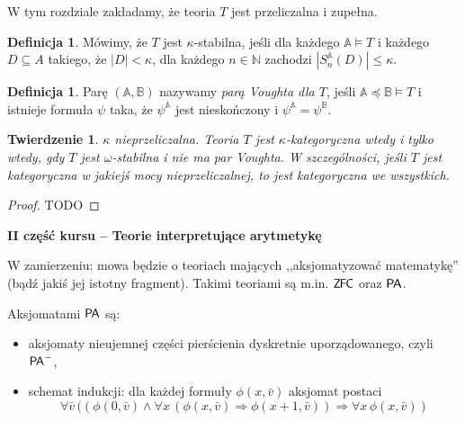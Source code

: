 \documentclass{article}
\newcommand{\N}{\mathbb{N}}
\newcommand{\A}{\mathbb{A}}
\newcommand{\B}{\mathbb{B}}
\theoremstyle{plain}
\newtheorem{tw}[thm]{Twierdzenie}
\theoremstyle{definition}
\newtheorem{df}[thm]{Definicja}
\theoremstyle{remark}
\newcommand{\PA}{\mathsf{P \mkern-1.9mu A}}
\newcommand{\ZFC}{\mathsf{Z \mkern-1.6mu F \mkern-1.5mu C}}
\begin{document}
W tym rozdziale zakładamy, że teoria $T$ jest przeliczalna i zupełna.

\begin{df}
	Mówimy, że $T$ jest $\kappa$-stabilna, jeśli dla każdego $\A \models T$ i każdego $D \subseteq A$ takiego, że $|D| < \kappa$, dla każdego $n \in \N$ zachodzi $|S_n^{\A}(D)| \leq \kappa$.
\end{df}

\begin{df}
	Parę $(\A, \B)$ nazywamy \textit{parą Voughta dla $T$}, jeśli $\A \preccurlyeq \B \models T$ i istnieje formuła $\psi$ taka, że $\psi^{\A}$ jest nieskończony i $\psi^{\A} = \psi^{\B}$.
\end{df}

\begin{tw}
	 $\kappa$ nieprzeliczalna. Teoria $T$ jest $\kappa$-kategoryczna wtedy i tylko wtedy, gdy $T$ jest $\omega$-stabilna i nie ma par Voughta.
	 W szczególności, jeśli $T$ jest kategoryczna w jakiejś mocy nieprzeliczalnej, to jest kategoryczna we wszystkich.
\end{tw}
\begin{proof}
	 TODO
\end{proof}

{\Large \textbf{II część kursu -- Teorie interpretujące arytmetykę}}

W zamierzeniu: mowa będzie o teoriach mających ,,aksjomatyzować matematykę'' (bądź jakiś jej istotny fragment).
Takimi teoriami są m.in. $\ZFC$ oraz $\PA$.

Aksjomatami $\PA$ są:
\begin{itemize}
	\item aksjomaty nieujemnej części pierścienia dyskretnie uporządowanego, czyli $\PA^-$,
	\item schemat indukcji: dla każdej formuły $\phi(x, \bar{v})$ aksjomat postaci
		\[
			\forall \bar{v} \, ((\phi(0, \bar{v}) \wedge \forall x \, (\phi(x, \bar{v}) \Rightarrow \phi(x+1, \bar{v}))\Rightarrow \forall x \, \phi(x, \bar{v}))
		\]
\end{itemize}
\end{document}
